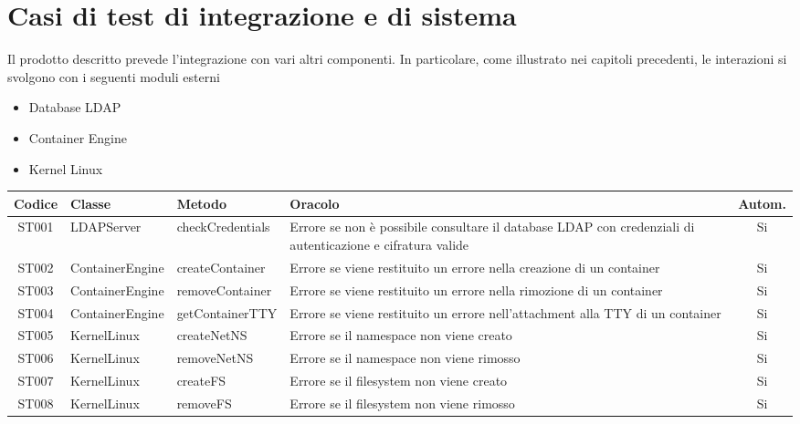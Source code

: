\documentclass[../main.tex]{subfiles}
\begin{document}
\chapter{Casi di test di integrazione e di sistema}

Il prodotto descritto prevede l'integrazione con vari altri componenti. In particolare, come illustrato nei capitoli precedenti, le interazioni si svolgono con i seguenti moduli esterni
\begin{itemize}
    \item Database LDAP
    \item Container Engine
    \item Kernel Linux
\end{itemize}

\clearpage

\begin{tabularx}{\linewidth}{|c|X|X|X|c|}
    \toprule
    \textbf{Codice}      & \textbf{Classe}        & \textbf{Metodo}        & \textbf{Oracolo} & \textbf{Autom.} \\ 
    \midrule
    \endhead
    ST001       & LDAPServer    & checkCredentials         & Errore se non è possibile consultare il database LDAP con credenziali di autenticazione e cifratura valide & Si \\ \hline
    ST002       & ContainerEngine    & createContainer         & Errore se viene restituito un errore nella creazione di un container & Si \\ \hline
    ST003       & ContainerEngine    & removeContainer         & Errore se viene restituito un errore nella rimozione di un container & Si \\ \hline
    ST004       & ContainerEngine    & getContainerTTY         & Errore se viene restituito un errore nell'attachment alla TTY di un container & Si \\ \hline 
    ST005       & KernelLinux    & createNetNS         & Errore se il namespace non viene creato & Si \\ \hline
    ST006       & KernelLinux    & removeNetNS         & Errore se il namespace non viene rimosso & Si \\ \hline
    ST007       & KernelLinux    & createFS         & Errore se il filesystem non viene creato & Si \\ \hline
    ST008       & KernelLinux    & removeFS         & Errore se il filesystem non viene rimosso & Si \\ \hline
\end{tabularx}
\end{document}
